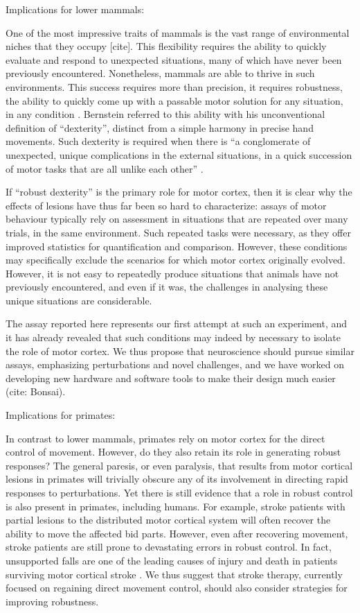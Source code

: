 Implications for lower mammals:

One of the most impressive traits of mammals is the vast range of environmental niches that they occupy [cite]. This flexibility requires the ability to quickly evaluate and respond to unexpected situations, many of which have never been previously encountered. Nonetheless, mammals are able to thrive in such environments. This success requires more than precision, it requires robustness, the ability to quickly come up with a passable motor solution for any situation, in any condition \cite{Bernstein1996}. Bernstein referred to this ability with his unconventional definition of “dexterity”, distinct from a simple harmony in precise hand movements. Such dexterity is required when there is \enquote{a conglomerate of unexpected, unique complications in the external situations, in a quick succession of motor tasks that are all unlike each other} \cite{Bernstein1996}.

If “robust dexterity” is the primary role for motor cortex, then it is clear why the effects of lesions have thus far been so hard to characterize: assays of motor behaviour typically rely on assessment in situations that are repeated over many trials, in the same environment. Such repeated tasks were necessary, as they offer improved statistics for quantification and comparison. However, these conditions may specifically exclude the scenarios for which motor cortex originally evolved. However, it is not easy to repeatedly produce situations that animals have not previously encountered, and even if it was, the challenges in analysing these unique situations are considerable.

The assay reported here represents our first attempt at such an experiment, and it has already revealed that such conditions may indeed by necessary to isolate the role of motor cortex. We thus propose that neuroscience should pursue similar assays, emphasizing perturbations and novel challenges, and we have worked on developing new hardware and software tools to make their design much easier (cite: Bonsai).



Implications for primates:

In contrast to lower mammals, primates rely on motor cortex for the direct control of movement. However, do they also retain its role in generating robust responses? The general paresis, or even paralysis, that results from motor cortical lesions in primates will trivially obscure any of its involvement in directing rapid responses to perturbations. Yet there is still evidence that a role in robust control is also present in primates, including humans. For example, stroke patients with partial lesions to the distributed motor cortical system will often recover the ability to move the affected bid parts. However, even after recovering movement, stroke patients are still prone to devastating errors in robust control. In fact, unsupported falls are one of the leading causes of injury and death in patients surviving motor cortical stroke \cite{Jacobs2014}. We thus suggest that stroke therapy, currently focused on regaining direct movement control, should also consider strategies for improving robustness.

